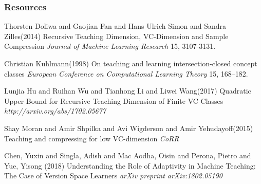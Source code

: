 \documentclass{beamer}
\begin{document}
\begin{frame}
\frametitle{Resources}
\footnotesize{
 \begin{thebibliography}{99} %
 Thorsten Doliwa and Gaojian Fan and Hans Ulrich Simon and Sandra Zilles(2014)
\newblock Recursive Teaching Dimension, VC-Dimension and Sample Compression
\newblock \emph{Journal of Machine Learning Research} 15, 3107-3131.
\end{thebibliography}
}

\footnotesize{
 \begin{thebibliography}{99} %
 Christian Kuhlmann(1998)
\newblock On teaching and learning intersection-closed concept classes
\newblock \emph{European Conference on Computational Learning Theory} 15, 168--182.
\end{thebibliography}
}

\footnotesize{
 \begin{thebibliography}{99} %
 Lunjia Hu and
               Ruihan Wu and
               Tianhong Li and
               Liwei Wang(2017)
\newblock Quadratic Upper Bound for Recursive Teaching Dimension of Finite VC
               Classes
\newblock \emph{http://arxiv.org/abs/1702.05677}
\end{thebibliography}
}

\footnotesize{
 \begin{thebibliography}{99} %
 Shay Moran and
               Amir Shpilka and
               Avi Wigderson and
               Amir Yehudayoff(2015)
\newblock Teaching and compressing for low VC-dimension
\newblock \emph{CoRR}
\end{thebibliography}
}


\footnotesize{
 \begin{thebibliography}{99} %
 Chen, Yuxin and Singla, Adish and Mac Aodha, Oisin and Perona, Pietro and Yue, Yisong (2018)
\newblock Understanding the Role of Adaptivity in Machine Teaching: The Case of Version Space Learners
\newblock \emph{arXiv preprint arXiv:1802.05190}
\end{thebibliography}
}


   
\end{frame}
\end{document}
